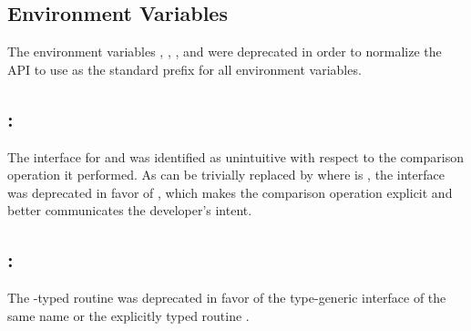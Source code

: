\subsection{ Environment Variables}\label{subsec:deprecate-sma-env}
The environment variables , ,
, and 
were deprecated in order to normalize the \openshmem \ac{API} to use
\shmemprefix{} as the standard prefix for all environment variables.

\subsection{\CorCpp: }
The \CorCpp interface for  and 
was identified as unintuitive with respect to
the comparison operation it performed.  As  can be trivially
replaced by  where  is
, the  interface was deprecated in
favor of , which makes the comparison operation
explicit and better communicates the developer's intent.

\subsection{\CorCpp: }
The -typed \CorCpp routine  was deprecated
in favor of the \Cstd[11] type-generic interface of the same name or the
explicitly typed \CorCpp routine .

